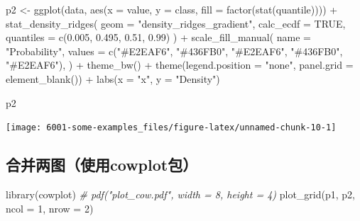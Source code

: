 \documentclass[
]{book}
\newenvironment{Shaded}{\begin{snugshade}}{\end{snugshade}}
\newcommand{\AttributeTok}[1]{\textcolor[rgb]{0.77,0.63,0.00}{#1}}
\newcommand{\CommentTok}[1]{\textcolor[rgb]{0.56,0.35,0.01}{\textit{#1}}}
\newcommand{\ConstantTok}[1]{\textcolor[rgb]{0.00,0.00,0.00}{#1}}
\newcommand{\DecValTok}[1]{\textcolor[rgb]{0.00,0.00,0.81}{#1}}
\newcommand{\FloatTok}[1]{\textcolor[rgb]{0.00,0.00,0.81}{#1}}
\newcommand{\FunctionTok}[1]{\textcolor[rgb]{0.00,0.00,0.00}{#1}}
\newcommand{\NormalTok}[1]{#1}
\newcommand{\OtherTok}[1]{\textcolor[rgb]{0.56,0.35,0.01}{#1}}
\newcommand{\SpecialCharTok}[1]{\textcolor[rgb]{0.00,0.00,0.00}{#1}}
\newcommand{\StringTok}[1]{\textcolor[rgb]{0.31,0.60,0.02}{#1}}
\begin{document}
\begin{Shaded}
\begin{Highlighting}[]
\NormalTok{p2 }\OtherTok{\textless{}{-}} \FunctionTok{ggplot}\NormalTok{(data, }\FunctionTok{aes}\NormalTok{(}\AttributeTok{x =}\NormalTok{ value, }\AttributeTok{y =}\NormalTok{ class, }\AttributeTok{fill =} \FunctionTok{factor}\NormalTok{(}\FunctionTok{stat}\NormalTok{(quantile)))) }\SpecialCharTok{+}
  \FunctionTok{stat\_density\_ridges}\NormalTok{(}
    \AttributeTok{geom =} \StringTok{"density\_ridges\_gradient"}\NormalTok{,}
    \AttributeTok{calc\_ecdf =} \ConstantTok{TRUE}\NormalTok{,}
    \AttributeTok{quantiles =} \FunctionTok{c}\NormalTok{(}\FloatTok{0.005}\NormalTok{, }\FloatTok{0.495}\NormalTok{, }\FloatTok{0.51}\NormalTok{, }\FloatTok{0.99}\NormalTok{)}
\NormalTok{  ) }\SpecialCharTok{+}
  \FunctionTok{scale\_fill\_manual}\NormalTok{(}
    \AttributeTok{name =} \StringTok{"Probability"}\NormalTok{, }\AttributeTok{values =} \FunctionTok{c}\NormalTok{(}\StringTok{"\#E2EAF6"}\NormalTok{, }\StringTok{"\#436FB0"}\NormalTok{, }\StringTok{"\#E2EAF6"}\NormalTok{, }\StringTok{"\#436FB0"}\NormalTok{, }\StringTok{"\#E2EAF6"}\NormalTok{),}
\NormalTok{  ) }\SpecialCharTok{+}
  \FunctionTok{theme\_bw}\NormalTok{() }\SpecialCharTok{+}
  \FunctionTok{theme}\NormalTok{(}\AttributeTok{legend.position =} \StringTok{"none"}\NormalTok{, }\AttributeTok{panel.grid =} \FunctionTok{element\_blank}\NormalTok{()) }\SpecialCharTok{+}
  \FunctionTok{labs}\NormalTok{(}\AttributeTok{x =} \StringTok{"x"}\NormalTok{, }\AttributeTok{y =} \StringTok{"Density"}\NormalTok{)}

\NormalTok{p2}
\end{Highlighting}
\end{Shaded}

\begin{center}\texttt{[image: 6001-some-examples\_files/figure-latex/unnamed-chunk-10-1]} \end{center}

\hypertarget{ux5408ux5e76ux4e24ux56feux4f7fux7528cowplotux5305}{%
\subsection{合并两图（使用cowplot包）}\label{ux5408ux5e76ux4e24ux56feux4f7fux7528cowplotux5305}}

\begin{Shaded}
\begin{Highlighting}[]
\FunctionTok{library}\NormalTok{(cowplot)}
\CommentTok{\# pdf("plot\_cow.pdf", width = 8, height = 4)}
\FunctionTok{plot\_grid}\NormalTok{(p1, p2, }\AttributeTok{ncol =} \DecValTok{1}\NormalTok{, }\AttributeTok{nrow =} \DecValTok{2}\NormalTok{)}
\end{Highlighting}
\end{Shaded}
\end{document}
